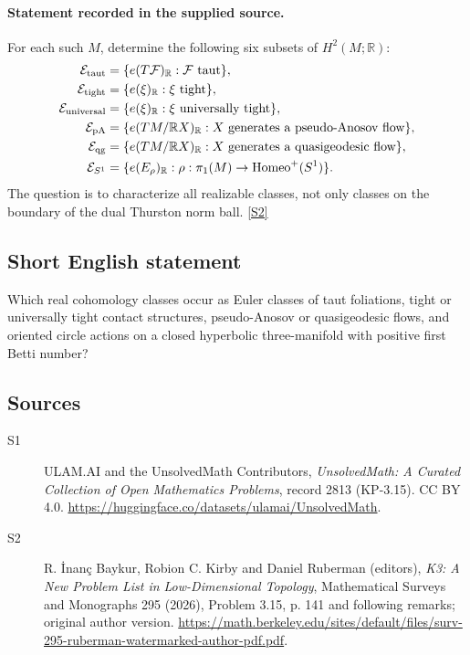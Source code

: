 \documentclass[11pt]{article}
\newcommand{\sref}[2]{\hyperlink{source:#1:#2}{[S#2]}}
\begin{document}
\paragraph{Statement recorded in the supplied source.}
For each such $M$, determine the following six subsets of $H^2(M;\mathbb R)$:
\[
\begin{aligned}
\mathcal E_{\rm taut}&=\{e(T\mathcal F)_{\mathbb R}:\mathcal F\text{ taut}\},\\
\mathcal E_{\rm tight}&=\{e(\xi)_{\mathbb R}:\xi\text{ tight}\},\\
\mathcal E_{\rm universal}&=\{e(\xi)_{\mathbb R}:\xi\text{ universally tight}\},\\
\mathcal E_{\rm pA}&=\{e(TM/\mathbb RX)_{\mathbb R}:X\text{ generates a pseudo-Anosov flow}\},\\
\mathcal E_{\rm qg}&=\{e(TM/\mathbb RX)_{\mathbb R}:X\text{ generates a quasigeodesic flow}\},\\
\mathcal E_{S^1}&=\{e(E_\rho)_{\mathbb R}:\rho:\pi_1(M)\to\operatorname{Homeo}^+(S^1)\}.
\end{aligned}
\]
The question is to characterize all realizable classes, not only classes on the boundary of the dual Thurston norm ball. \sref{2813}{2}
\subsection{Short English statement}
Which real cohomology classes occur as Euler classes of taut foliations, tight or universally tight contact structures, pseudo-Anosov or quasigeodesic flows, and oriented circle actions on a closed hyperbolic three-manifold with positive first Betti number?
\subsection{Sources}
\begin{description}
\item[\hypertarget{source:2813:1}{S1}] ULAM.AI and the UnsolvedMath Contributors, \emph{UnsolvedMath: A Curated Collection of Open Mathematics Problems}, record 2813 (KP-3.15). CC BY 4.0. \url{https://huggingface.co/datasets/ulamai/UnsolvedMath}.
\item[\hypertarget{source:2813:2}{S2}] R. İnanç Baykur, Robion C. Kirby and Daniel Ruberman (editors), \emph{K3: A New Problem List in Low-Dimensional Topology}, Mathematical Surveys and Monographs 295 (2026), Problem 3.15, p. 141 and following remarks; original author version. \url{https://math.berkeley.edu/sites/default/files/surv-295-ruberman-watermarked-author-pdf.pdf}.
\end{description}
\label{end:2813}
\end{document}
